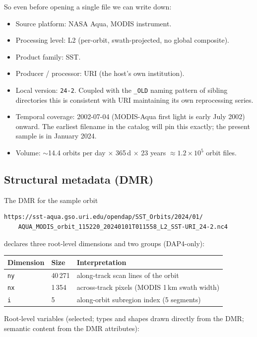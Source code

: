 \documentclass[11pt]{article}
\begin{document}
So even before opening a single file we can write down:
\begin{itemize}
  \item Source platform: NASA Aqua, MODIS instrument.
  \item Processing level: L2 (per-orbit, swath-projected, no global
    composite).
  \item Product family: SST.
  \item Producer / processor: URI (the host's own institution).
  \item Local version: \texttt{24-2}. Coupled with the
    \texttt{\_OLD} naming pattern of sibling directories this is
    consistent with URI maintaining its own reprocessing series.
  \item Temporal coverage: 2002-07-04 (MODIS-Aqua first light is
    early July 2002) onward. The earliest filename in the
    catalog will pin this exactly; the present sample is in
    January 2024.
  \item Volume: $\sim$14.4 orbits per day $\times$ 365\,d $\times$
    23 years $\approx 1.2\times 10^5$ orbit files.
\end{itemize}

\subsection{Structural metadata (DMR)}

The DMR for the sample orbit
\begin{lstlisting}
https://sst-aqua.gso.uri.edu/opendap/SST_Orbits/2024/01/
    AQUA_MODIS_orbit_115220_20240101T011558_L2_SST-URI_24-2.nc4
\end{lstlisting}
declares three root-level dimensions and two groups (DAP4-only):

\begin{center}
\begin{tabular}{@{}lll@{}}
\toprule
Dimension & Size & Interpretation \\
\midrule
\texttt{ny} & 40\,271 & along-track scan lines of the orbit \\
\texttt{nx} & 1\,354  & across-track pixels (MODIS 1\,km swath width) \\
\texttt{i}  & 5       & along-orbit subregion index (5 segments) \\
\bottomrule
\end{tabular}
\end{center}

Root-level variables (selected; types and shapes drawn directly from
the DMR; semantic content from the DMR attributes):
\end{document}
